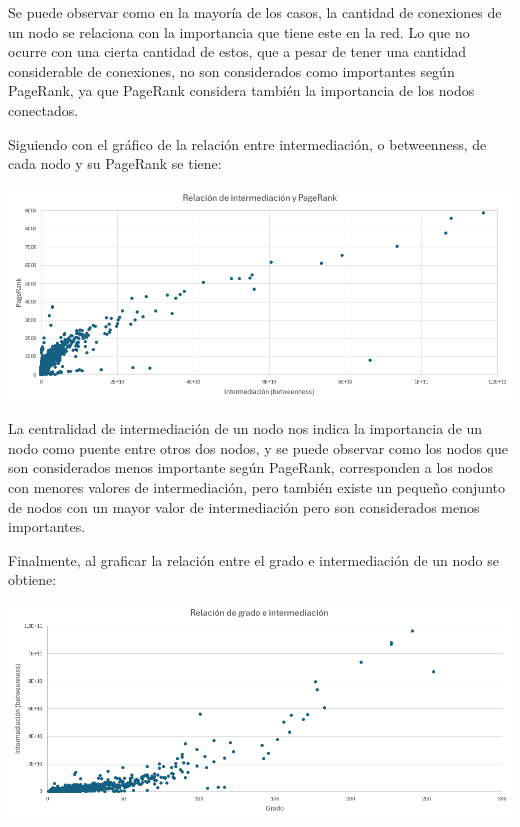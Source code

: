 \documentclass[12pt]{article}
\begin{document}
Se puede observar como en la mayoría de los casos, la cantidad de conexiones de un nodo se relaciona con la importancia que tiene este en la red. Lo que no ocurre con una cierta cantidad de estos, que a pesar de tener una cantidad considerable de conexiones, no son considerados como importantes según PageRank, ya que PageRank considera también la importancia de los nodos conectados.

Siguiendo con el gráfico de la relación entre intermediación, o betweenness, de cada nodo y su PageRank se tiene: 

\begin{center}
    \includegraphics[scale=0.6]{images/distribucion_betweenness_pagerank.png}
\end{center}

La centralidad de intermediación de un nodo nos indica la importancia de un nodo como puente entre otros dos nodos, y se puede observar como los nodos que son considerados menos importante según PageRank, corresponden a los nodos con menores valores de intermediación, pero también existe un pequeño conjunto de nodos con un mayor valor de intermediación pero son considerados menos importantes.

Finalmente, al graficar la relación entre el grado e intermediación de un nodo se obtiene:

\begin{center}
    \includegraphics[scale=0.6]{images/distribucion_grado_betweenness.png}
\end{center}
\end{document}
